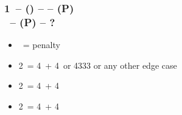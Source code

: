 \documentclass[12pt, a4paper]{article}
\begin{document}
\subsubsection*{1\ntx\ -- (\dbl) --  -- (P)\\
                \rdbl\ -- (P) -- ?}
\begin{itemize}
    \item \pass\ = penalty
    \item 2\clubs\ = 4\clubs\ + 4\ or 4333 or any other edge case
    \item 2\diams\ = 4\diams\ + 4\major
    \item 2\hearts\ = 4\hearts\ + 4\spades
\end{itemize}

\end{document}
